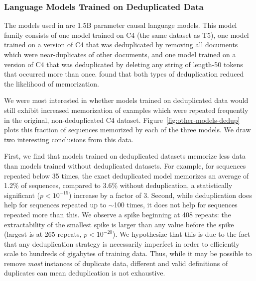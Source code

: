 \subsubsection{Language Models Trained on Deduplicated Data}

The models used in \citet{2021dedup} are 1.5B parameter causal language models.
This model family consists of one model trained on C4 (the same dataset as T5), one model trained on a version of C4 that was deduplicated by removing all documents which were near-duplicates of other documents, and one model trained on a version of C4 that was deduplicated by deleting any string of length-50 tokens that occurred more than once.
\citet{2021dedup} found that both types of deduplication reduced the likelihood of memorization.

We were most interested in whether models trained on deduplicated data would still exhibit increased memorization of examples which were repeated frequently in the original, non-deduplicated C4 dataset.
%
Figure~\ref{fig:other-models-dedup} plots this fraction of sequences memorized by each of the three models.
%
We draw two interesting conclusions from this data.


First, we find that models trained on deduplicated datasets memorize less data than models trained without deduplicated datasets.
%
For example, for sequences repeated below 35 times, the exact deduplicated model memorizes an average of 1.2\% of sequences, compared to 3.6\% without deduplication, a statistically significant ($p<10^{-15}$) increase by a factor of 3. 
Second, while deduplication does help for sequences repeated up to $\sim$100 times,
it does not help for sequences repeated more than this.
%
We observe a spike beginning at 408 repeats: the extractability of the smallest spike is larger than any value before the spike (largest is at 265 repeats, $p<10^{-20}$).
%
We hypothesize that this is due to the fact that any deduplication strategy is necessarily
imperfect in order to efficiently scale to hundreds of gigabytes of training data.
%
Thus, while it may be possible to remove \emph{most} instances of duplicate data, different and valid definitions of duplicates can mean deduplication is not exhaustive.

